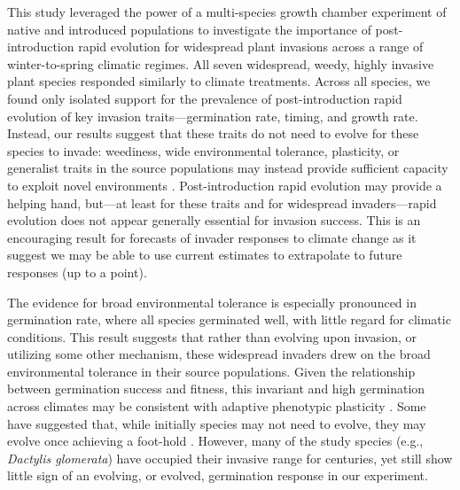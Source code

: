 \documentclass[11pt]{article}\usepackage[]{graphicx}\usepackage[]{color}
\begin{document}
	This study leveraged the power of a multi-species growth chamber experiment of native and introduced populations to investigate the importance of post-introduction rapid evolution for widespread plant invasions across a range of winter-to-spring climatic regimes.  All seven widespread, weedy, highly invasive plant species responded similarly to climate treatments. Across all species, we found only isolated support for the prevalence of post-introduction rapid evolution of key invasion traits---germination rate, timing, and growth rate. Instead, our results suggest that these traits do not need to evolve for these species to invade: weediness, wide environmental tolerance, plasticity, or generalist traits in the source populations may instead provide sufficient capacity to exploit novel environments \parencite{Baker1965}. Post-introduction rapid evolution may provide a helping hand, but---at least for these traits and for widespread invaders---rapid evolution does not appear generally essential for invasion success. This is an encouraging result for forecasts of invader responses to climate change as it suggest we may be able to use current estimates to extrapolate to future responses (up to a point). 
	
	The evidence for broad environmental tolerance is especially pronounced in germination rate, where all species germinated well, with little regard for climatic conditions. This result suggests that rather than evolving upon invasion, or utilizing some other mechanism, these widespread invaders drew on the broad environmental tolerance in their source populations. Given the relationship between germination success and fitness, this invariant and high germination across climates may be consistent with adaptive phenotypic plasticity \parencite{Baker1965}. Some have suggested that, while initially species may not need to evolve, they may evolve once achieving a foot-hold \parencite{Lamarque2015}. However, many of the study species (e.g., \textit{Dactylis glomerata}) have occupied their invasive range for centuries, yet still show little sign of an evolving, or evolved, germination response in our experiment. 
	
\end{document}
